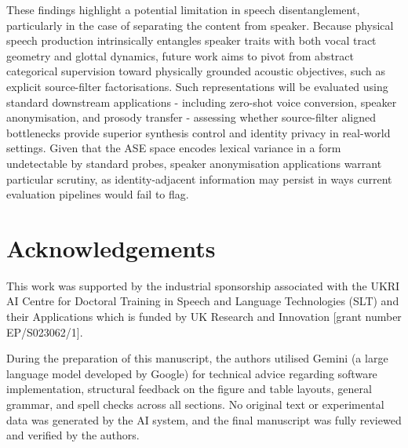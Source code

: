 \documentclass[conference,letterpaper]{IEEEtran}
\begin{document}
\vspace{-0.1cm}

These findings highlight a potential limitation in speech disentanglement, particularly in the case of separating the content from speaker. Because physical speech production intrinsically entangles speaker traits with both vocal tract geometry and glottal dynamics, future work aims to pivot from abstract categorical supervision toward physically grounded acoustic objectives, such as explicit source-filter factorisations. Such representations will be evaluated using standard downstream applications - including zero-shot voice conversion, speaker anonymisation, and prosody transfer - assessing whether source-filter aligned bottlenecks provide superior synthesis control and identity privacy in real-world settings. Given that the ASE space encodes lexical variance in a form undetectable by standard probes, speaker anonymisation applications warrant particular scrutiny, as identity-adjacent information may persist in ways current evaluation pipelines would fail to flag.


\section{Acknowledgements}

\noindent This work was supported by the industrial sponsorship associated with the UKRI AI Centre for Doctoral Training in Speech and Language Technologies (SLT) and their Applications which is funded by UK Research and Innovation [grant number EP/S023062/1].

\smallskip

\noindent During the preparation of this manuscript, the authors utilised Gemini (a large language model developed by Google) for technical advice regarding software implementation, structural feedback on the figure and table layouts, general grammar, and spell checks across all sections. No original text or experimental data was generated by the AI system, and the final manuscript was fully reviewed and verified by the authors.






\end{document}
